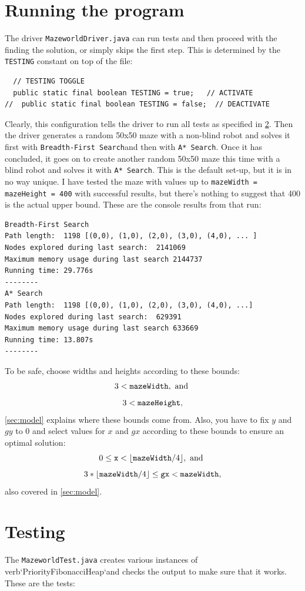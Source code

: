 \documentclass{article}
\begin{document}
\section{Running the program}
\label{sec:driver}
The driver \verb`MazeworldDriver.java` can run tests and then proceed with the finding the solution, or simply skips the first step. This is determined by the \verb`TESTING` constant on top of the file:
\begin{lstlisting}
  // TESTING TOGGLE 
  public static final boolean TESTING = true;   // ACTIVATE
//  public static final boolean TESTING = false;  // DEACTIVATE
\end{lstlisting}
Clearly, this configuration tells the driver to run all tests as specified in \cref{sec:testing}. Then the driver generates a random 50x50 maze with a non-blind robot and solves it first with \verb`Breadth-First Search`and then with \verb`A* Search`. Once it has concluded, it goes on to create another random 50x50 maze this time with a blind robot and solves it with \verb`A* Search`. This is the default set-up, but it is in no way unique. I have tested the maze with values up to \verb`mazeWidth = mazeHeight = 400` with successful results, but there's nothing to suggest that 400 is the actual upper bound. These are the console results from that run:\\
\begin{lstlisting}
Breadth-First Search
Path length:  1198 [(0,0), (1,0), (2,0), (3,0), (4,0), ... ]
Nodes explored during last search:  2141069
Maximum memory usage during last search 2144737
Running time: 29.776s
--------
A* Search
Path length:  1198 [(0,0), (1,0), (2,0), (3,0), (4,0), ...]
Nodes explored during last search:  629391
Maximum memory usage during last search 633669
Running time: 13.807s
--------
\end{lstlisting}
To be safe, choose widths and heights according to these bounds:
 \[
   3 < \verb`mazeWidth` , \text{ and }
 \] 
 \[
   3 < \verb`mazeHeight`,
 \]
\cref{sec:model} explains where these bounds come from. Also, you have to fix $y$ and $gy$ to $0$ and select values for $x$ and $gx$ according to these bounds to ensure an optimal solution:
  \[
   0 \leq \verb`x` < \lfloor \verb`mazeWidth` / 4 \rfloor , \text{ and }
 \]
 \[
    3 * \lfloor \verb`mazeWidth` / 4 \rfloor \leq  \verb`gx` < \verb`mazeWidth`,
\]
 also covered in \cref{sec:model}.
 
\section{Testing}
\label{sec:testing}
The \verb`MazeworldTest.java` creates various instances of verb`PriorityFibonacciHeap`and checks the output to make sure that it works. These are the tests:
\end{document}
